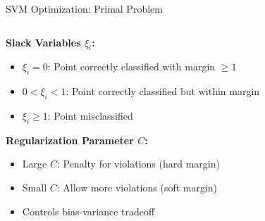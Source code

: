 \documentclass[8pt,aspectratio=1610]{beamer}
\begin{document}
\begin{frame}{SVM Optimization: Primal Problem}
\begin{columns}[t]
\begin{column}{0.48\textwidth}
\vspace{0.3cm}
\textbf{Slack Variables $\xi_i$:}
\begin{itemize}
\setlength{\itemsep}{1pt}
\item $\xi_i = 0$: Point correctly classified with margin $\geq 1$
\item $0 < \xi_i < 1$: Point correctly classified but within margin
\item $\xi_i \geq 1$: Point misclassified
\end{itemize}

\vspace{0.3cm}
\textbf{Regularization Parameter $C$:}
\begin{itemize}
\setlength{\itemsep}{1pt}
\item Large $C$: Penalty for violations (hard margin)
\item Small $C$: Allow more violations (soft margin)
\item Controls bias-variance tradeoff
\end{itemize}
\end{column}
\end{columns}
\end{frame}
\end{document}

